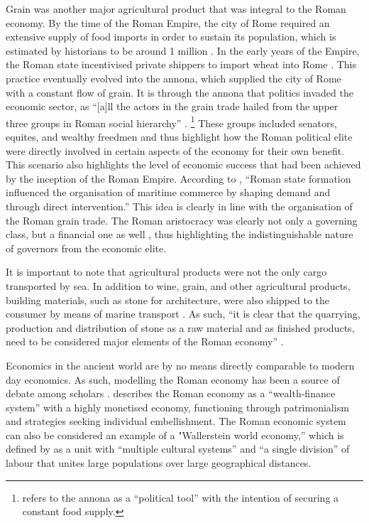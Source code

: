 

Grain was another major agricultural product that was integral to the Roman economy. By the time of the Roman Empire, the city of Rome required an extensive supply of food imports in order to sustain its population, which is estimated by historians to be around 1 million \parencite[315]{Kessler_2007}. In the early years of the Empire, the Roman state incentivised private shippers to import wheat into Rome \parencite[47]{Kehoe_2013}. This practice eventually evolved into the annona, which supplied the city of Rome with a constant flow of grain. It is through the annona that politics invaded the economic sector, as “[a]ll the actors in the grain trade hailed from the upper three groups in Roman social hierarchy” \parencite[317]{Kessler_2007}.
\footnote{\textcite[289]{Wilson_2012} refers to the annona as a “political tool” with the intention of securing a constant food supply.} These groups included senators, equites, and wealthy freedmen and thus highlight how the Roman political elite were directly involved in certain aspects of the economy for their own benefit. This scenario also highlights the level of economic success that had been achieved by the inception of the Roman Empire. According to \textcite[14]{Scheidel_2009a}, “Roman state formation influenced the organisation of maritime commerce by shaping demand and through direct intervention.” This idea is clearly in line with the organisation of the Roman grain trade. The Roman aristocracy was clearly not only a governing class, but a financial one as well \parencite[235]{Adams_2012}, thus highlighting the indistinguishable nature of governors from the economic elite. 

It is important to note that agricultural products were not the only cargo transported by sea. In addition to wine, grain, and other agricultural products, building materials, such as stone for architecture, were also shipped to the consumer by means of marine transport \parencite[150]{Russell_2011}. As such, “it is clear that the quarrying, production and distribution of stone as a raw material and as ﬁnished products, need to be considered major elements of the Roman economy”  \parencite[151]{Russell_2011}.

Economics in the ancient world are by no means directly comparable to modern day economics. As such, modelling the Roman economy has been a source of debate among scholars \parencites{Finley_1999}{Hopkins_1980}{Storey_2004}{Woolf_1990}{Woolf_1992}. \textcite[126]{Storey_2004} describes the Roman economy as a “wealth-finance system” with a highly monetised economy, functioning through patrimonialism and strategies seeking individual embellishment. The Roman economic system can also be considered an example of a "Wallerstein world economy,” which is defined by \textcite[44]{Woolf_1990} as a unit with “multiple cultural systems” and “a single division” of labour that unites large populations over large geographical distances.

